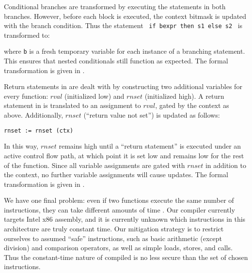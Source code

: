 Conditional branches are transformed by executing the statements in both
branches. However, before each block is executed, the context bitmask is
updated with the branch condition. Thus the statement ~\texttt{if bexpr then s1
else s2}~ is transformed to:
\begin{center}
\end{center}
where \texttt{b} is a fresh temporary variable for each instance of a branching
statement. This ensures that nested conditionals still function as expected.
The formal transformation is given in .

Return statements in \constc are dealt with by constructing two additional
variables for every function: $rval$ (initialized low) and $rnset$ (initialized
high). A return statement in \constc is translated to an assignment to $rval$,
gated by the context as above.  Additionally, $rnset$ (``return value not
set'') is updated as follows:
\begin{center}
  \texttt{rnset := rnset \band (\bnot ctx)}
\end{center}
In this way, $rnset$ remains high until a ``return statement'' is executed
under an active control flow path, at which point it is set low and remains low
for the rest of the function. Since all variable assignments are gated with
$rnset$ in addition to the context, no further variable assignments will cause
updates.  The formal transformation is given in .

We have one final problem: even if two functions execute the same number of
instructions, they can take different amounts of time . Our compiler
currently targets Intel x86 assembly, and it is currently unknown  which instructions in this architecture are truly constant time. Our
mitigation strategy is to restrict ourselves to assumed ``safe'' instructions,
such as basic arithmetic (except division) and comparison operators, as well as
simple loads, stores, and calls. Thus the constant-time nature of compiled
\ccore is no less secure than the set of chosen instructions.
